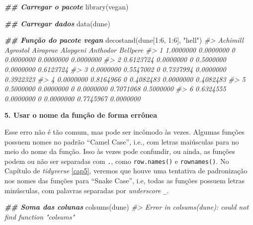\documentclass[
]{book}
\newenvironment{Shaded}{\begin{snugshade}}{\end{snugshade}}
\newcommand{\CommentTok}[1]{\textcolor[rgb]{0.37,0.37,0.37}{\textit{#1}}}
\newcommand{\DecValTok}[1]{\textcolor[rgb]{0.06,0.06,0.06}{#1}}
\newcommand{\DocumentationTok}[1]{\textcolor[rgb]{0.37,0.37,0.37}{\textbf{\textit{#1}}}}
\newcommand{\FunctionTok}[1]{\textcolor[rgb]{0,0,0}{#1}}
\newcommand{\NormalTok}[1]{#1}
\newcommand{\SpecialCharTok}[1]{\textcolor[rgb]{0,0,0}{#1}}
\newcommand{\StringTok}[1]{\textcolor[rgb]{0.5,0.5,0.5}{#1}}
\begin{document}
\begin{Shaded}
\begin{Highlighting}[]
\DocumentationTok{\#\# Carregar o pacote}
\FunctionTok{library}\NormalTok{(vegan)}

\DocumentationTok{\#\# Carregar dados}
\FunctionTok{data}\NormalTok{(dune)}

\DocumentationTok{\#\# Função do pacote vegan}
\FunctionTok{decostand}\NormalTok{(dune[}\DecValTok{1}\SpecialCharTok{:}\DecValTok{6}\NormalTok{, }\DecValTok{1}\SpecialCharTok{:}\DecValTok{6}\NormalTok{], }\StringTok{"hell"}\NormalTok{)}
\CommentTok{\#\textgreater{}    Achimill  Agrostol Airaprae  Alopgeni  Anthodor  Bellpere}
\CommentTok{\#\textgreater{} 1 1.0000000 0.0000000        0 0.0000000 0.0000000 0.0000000}
\CommentTok{\#\textgreater{} 2 0.6123724 0.0000000        0 0.5000000 0.0000000 0.6123724}
\CommentTok{\#\textgreater{} 3 0.0000000 0.5547002        0 0.7337994 0.0000000 0.3922323}
\CommentTok{\#\textgreater{} 4 0.0000000 0.8164966        0 0.4082483 0.0000000 0.4082483}
\CommentTok{\#\textgreater{} 5 0.5000000 0.0000000        0 0.0000000 0.7071068 0.5000000}
\CommentTok{\#\textgreater{} 6 0.6324555 0.0000000        0 0.0000000 0.7745967 0.0000000}
\end{Highlighting}
\end{Shaded}

\textbf{5. Usar o nome da função de forma errônea}

Esse erro não é tão comum, mas pode ser incômodo às vezes. Algumas funções possuem nomes no padrão ``Camel Case'', i.e., com letras maiúsculas para no meio do nome da função. Isso às vezes pode confundir, ou ainda, as funções podem ou não ser separadas com \texttt{.}, como \texttt{row.names()} e \texttt{rownames()}. No Capítulo de \emph{tidyverse} \ref{cap5}, veremos que houve uma tentativa de padronização nos nomes das funções para ``Snake Case'', i.e, todas as funções possuem letras minúsculas, com palavras separadas por \emph{underscore} \texttt{\_}.

\begin{Shaded}
\begin{Highlighting}[]
\DocumentationTok{\#\# Soma das colunas}
\FunctionTok{colsums}\NormalTok{(dune)}
\CommentTok{\#\textgreater{} Error in colsums(dune): could not find function "colsums"}
\end{Highlighting}
\end{Shaded}
\end{document}
